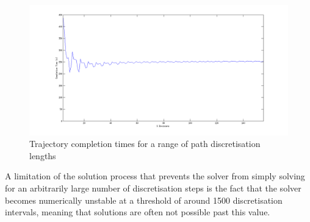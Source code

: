 \begin{figure}[htbp]  
\includegraphics[width=\textwidth]{figures/performance/sDivisions.png}
\caption[Trajectory completion time for a range of path discretisation lengths]{Trajectory completion times for a range of path discretisation lengths
\label{fig:sDivisions}}
\end{figure} 

A limitation of the solution process that prevents the solver from simply solving for an arbitrarily large number of discretisation steps is the fact that the solver becomes numerically unstable at a threshold of around 1500 discretisation intervals, meaning that solutions are often not possible past this value.
